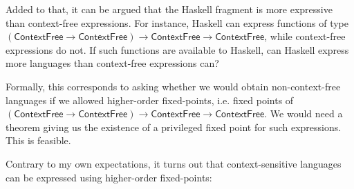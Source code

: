 Added to that, it can be argued that the Haskell fragment is more expressive than context-free expressions. For instance, Haskell can express functions of type $(\textsf{ContextFree}\rightarrow \textsf{ContextFree})\rightarrow  \textsf{ContextFree}\rightarrow \textsf{ContextFree}$, while context-free expressions do not. If such functions are available to Haskell, can Haskell express more languages than context-free expressions can? 

Formally, this corresponds to asking whether we would obtain non-context-free languages if we allowed higher-order fixed-points, i.e. fixed points of $(\textsf{ContextFree}\rightarrow \textsf{ContextFree})\rightarrow  \textsf{ContextFree}\rightarrow \textsf{ContextFree}$. We would need a theorem giving us the existence of a privileged fixed point for such expressions. This is feasible. 

Contrary to my own expectations, it turns out that context-sensitive languages can be expressed using higher-order fixed-points:






